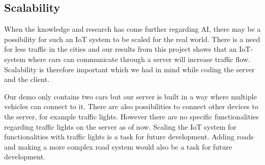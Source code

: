 \subsection{Scalability}
When the knowledge and research has come further regarding AI, there may be a possibility for such an IoT system to be scaled for the real world. There is a need for less traffic in the cities and our results from this project shows that an IoT-system where cars can communicate through a server will increase traffic flow. Scalability is therefore important which we had in mind while coding the server and the client.

Our demo only contains two cars but our server is built in a way where multiple vehicles can connect to it. There are also possibilities to connect other devices to the server, for example traffic lights. However there are no specific functionalities regarding traffic lights on the server as of now. Scaling the IoT system for functionalities with traffic lights is a task for future development. Adding roads and making a more complex road system would also be a task for future development. 
